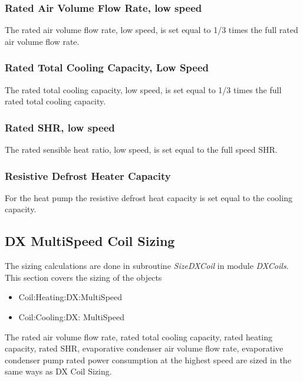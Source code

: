 \subsubsection{Rated Air Volume Flow Rate, low speed}\label{rated-air-volume-flow-rate-low-speed}

The rated air volume flow rate, low speed, is set equal to 1/3 times the full rated air volume flow rate.

\subsubsection{Rated Total Cooling Capacity, Low Speed}\label{rated-total-cooling-capacity-low-speed}

The rated total cooling capacity, low speed, is set equal to 1/3 times the full rated total cooling capacity.

\subsubsection{Rated SHR, low speed}\label{rated-shr-low-speed}

The rated sensible heat ratio, low speed, is set equal to the full speed SHR.

\subsubsection{Resistive Defrost Heater Capacity}\label{resistive-defrost-heater-capacity}

For the heat pump the resistive defrost heat capacity is set equal to the cooling capacity.

\subsection{DX MultiSpeed Coil Sizing}\label{dx-multispeed-coil-sizing}

The sizing calculations are done in subroutine \emph{SizeDXCoil} in module \emph{DXCoils}. This section covers the sizing of the objects

\begin{itemize}
\item
  Coil:Heating:DX:MultiSpeed
\item
  Coil:Cooling:DX: MultiSpeed
\end{itemize}

The rated air volume flow rate, rated total cooling capacity, rated heating capacity, rated SHR, evaporative condenser air volume flow rate, evaporative condenser pump rated power consumption at the highest speed are sized in the same ways as DX Coil Sizing.

